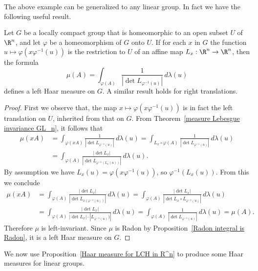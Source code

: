 The  above example can be generalized to any linear group. In fact we have the following useful result.
\begin{proposition}\label{Haar measure for LCH in R^n}
Let $G$ be a locally compact group that is homeomorphic to an open subset $U$ of $\R^n$, and let $\varphi$ be a homeomorphism of $G$ onto $U$. If for each $x$ in $G$ the function $u\mapsto\varphi(x\varphi^{-1}(u))$ is the restriction to $U$ of an affine map $L_x:\R^n\to\R^n$, then the formula
\[\mu(A)=\int_{\varphi(A)}\frac{1}{|\det L_{\varphi^{-1}(u)}|}\,d\lambda(u)\]
defines a left Haar measure on $G$. A similar result holds for right translations.
\end{proposition}
\begin{proof}
First we observe that, the map $x\mapsto\varphi(x\varphi^{-1}(u))$ is in fact the left translation on $U$, inherited from that on $G$. From Theorem~\ref{measure Lebesgue invariance GL_n}, it follows that
\begin{align*}
\mu(xA)&=\int_{\varphi(xA)}\frac{1}{|\det L_{\varphi^{-1}(u)}|}\,d\lambda(u)=\int_{L_x\circ\varphi(A)}\frac{1}{|\det L_{\varphi^{-1}(u)}|}\,d\lambda(u)\\
&=\int_{\varphi(A)}\frac{|\det L_x|}{|\det L_{\varphi^{-1}(L_x(u))}|}\,d\lambda(u).
\end{align*}
By assumption we have $L_x(u)=\varphi(x\varphi^{-1}(u))$, so $\varphi^{-1}(L_x(u))$. From this we conclude 
\begin{align*}
\mu(xA)&=\int_{\varphi(A)}\frac{|\det L_x|}{|\det L_{x(\varphi^{-1}(u))}|}\,d\lambda(u)=\int_{\varphi(A)}\frac{|\det L_x|}{|\det L_{x}\circ L_{\varphi^{-1}(u)}|}\,d\lambda(u)\\
&=\int_{\varphi(A)}\frac{|\det L_x|}{|\det L_{x}|\cdot|L_{\varphi^{-1}(u)})|}\,d\lambda(u)=\int_{\varphi(A)}\frac{1}{|\det L_{\varphi^{-1}(u)}|}\,d\lambda(u)=\mu(A).
\end{align*}
Therefore $\mu$ is left-invariant. Since $\mu$ is Radon by Proposition~\ref{Radon integral is Radon}, it is a left Haar measure on $G$.
\end{proof}
We now use Proposition~\ref{Haar measure for LCH in R^n} to produce some Haar measures for linear groups.
